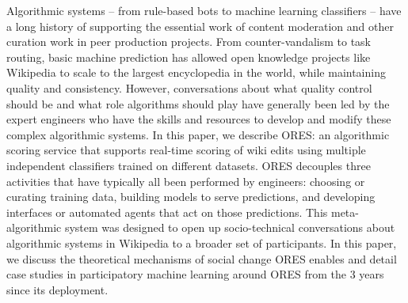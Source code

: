 Algorithmic systems -- from rule-based bots to machine learning classifiers -- have a long history of supporting the essential work of content moderation and other curation work in peer production projects.  From counter-vandalism to task routing, basic machine prediction has allowed open knowledge projects like Wikipedia to scale to the largest encyclopedia in the world, while maintaining quality and consistency.  However, conversations about what quality control should be and what role algorithms should play have generally been led by the expert engineers who have the skills and resources to develop and modify these complex algorithmic systems. In this paper, we describe ORES: an algorithmic scoring service that supports real-time scoring of wiki edits using multiple independent classifiers trained on different datasets. ORES decouples three activities that have typically all been performed by engineers: choosing or curating training data, building models to serve predictions, and developing interfaces or automated agents that act on those predictions. This meta-algorithmic system was designed to open up socio-technical conversations about algorithmic systems in Wikipedia to a broader set of participants.  In this paper, we discuss the theoretical mechanisms of social change ORES enables and detail case studies in participatory machine learning around ORES from the 3 years since its deployment.